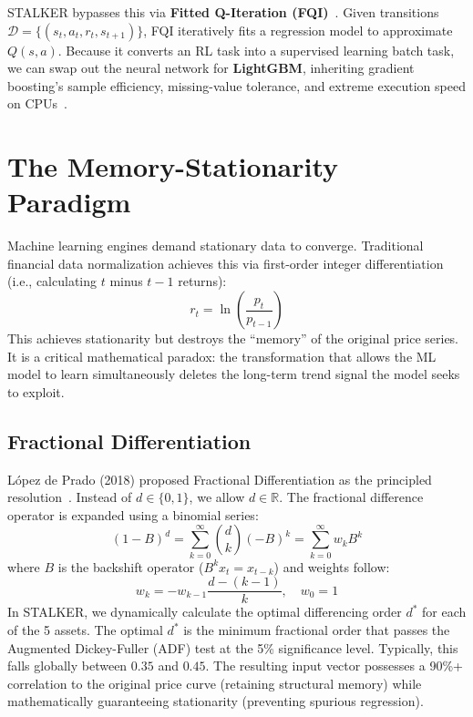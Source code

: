 \documentclass[journal,10pt,twocolumn]{IEEEtran}
\begin{document}
STALKER bypasses this via \textbf{Fitted Q-Iteration (FQI)}~\cite{ernst2005tree}. Given transitions $\mathcal{D} = \{(s_t, a_t, r_t, s_{t+1})\}$, FQI iteratively fits a regression model to approximate $Q(s, a)$. Because it converts an RL task into a supervised learning batch task, we can swap out the neural network for \textbf{LightGBM}, inheriting gradient boosting's sample efficiency, missing-value tolerance, and extreme execution speed on CPUs~\cite{ke2017lightgbm}.

\section{The Memory-Stationarity Paradigm}
\label{sec:engineering}

Machine learning engines demand stationary data to converge. Traditional financial data normalization achieves this via first-order integer differentiation (i.e., calculating $t$ minus $t-1$ returns):
\begin{equation}
r_t = \ln\left(\frac{p_t}{p_{t-1}}\right)
\end{equation}
This achieves stationarity but destroys the ``memory'' of the original price series. It is a critical mathematical paradox: the transformation that allows the ML model to learn simultaneously deletes the long-term trend signal the model seeks to exploit.

\subsection{Fractional Differentiation}
L\'{o}pez de Prado (2018) proposed Fractional Differentiation as the principled resolution~\cite{lopez2018advances}. Instead of $d \in \{0, 1\}$, we allow $d \in \mathbb{R}$. The fractional difference operator is expanded using a binomial series:
\begin{equation}
(1 - B)^d = \sum_{k=0}^{\infty} \binom{d}{k}(-B)^k = \sum_{k=0}^{\infty} w_k B^k
\end{equation}
where $B$ is the backshift operator ($B^k x_t = x_{t-k}$) and weights follow:
\begin{equation}
w_k = -w_{k-1} \frac{d - (k-1)}{k}, \quad w_0 = 1
\end{equation}
In STALKER, we dynamically calculate the optimal differencing order $d^*$ for each of the 5 assets. The optimal $d^*$ is the minimum fractional order that passes the Augmented Dickey-Fuller (ADF) test at the 5\% significance level. Typically, this falls globally between $0.35$ and $0.45$. The resulting input vector possesses a 90\%+ correlation to the original price curve (retaining structural memory) while mathematically guaranteeing stationarity (preventing spurious regression).
\end{document}
